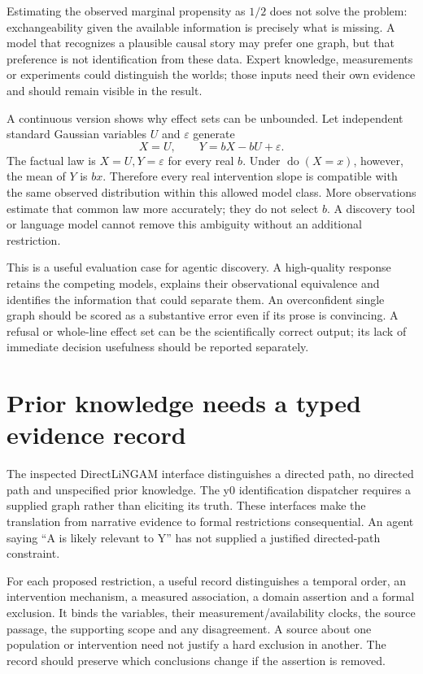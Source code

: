 Estimating the observed marginal propensity as $1/2$ does not solve the
problem: exchangeability given the available information is precisely what is
missing. A model that recognizes a plausible causal story may prefer one graph,
but that preference is not identification from these data. Expert knowledge,
measurements or experiments could distinguish the worlds; those inputs need
their own evidence and should remain visible in the result.

A continuous version shows why effect sets can be unbounded. Let independent
standard Gaussian variables $U$ and $\varepsilon$ generate
\[
 X=U,\qquad Y=bX-bU+\varepsilon.
\]
The factual law is $X=U,Y=\varepsilon$ for every real $b$. Under
$\operatorname{do}(X=x)$, however, the mean of $Y$ is $bx$. Therefore every
real intervention slope is compatible with the same observed distribution
within this allowed model class. More observations estimate that common law
more accurately; they do not select $b$. A discovery tool or language model
cannot remove this ambiguity without an additional restriction.

This is a useful evaluation case for agentic discovery. A high-quality response
retains the competing models, explains their observational equivalence and
identifies the information that could separate them. An overconfident single
graph should be scored as a substantive error even if its prose is convincing.
A refusal or whole-line effect set can be the scientifically correct output;
its lack of immediate decision usefulness should be reported separately.

\section{Prior knowledge needs a typed evidence record}

The inspected DirectLiNGAM interface distinguishes a directed path, no directed
path and unspecified prior knowledge. The y0 identification dispatcher requires
a supplied graph rather than eliciting its truth. These interfaces make the
translation from narrative evidence to formal restrictions consequential.
An agent saying ``A is likely relevant to Y'' has not supplied a justified
directed-path constraint. \citep{v13_sw_lingam,v13_sw_y0}

For each proposed restriction, a useful record distinguishes a temporal order,
an intervention mechanism, a measured association, a domain assertion and a
formal exclusion. It binds the variables, their measurement/availability clocks,
the source passage, the supporting scope and any disagreement. A source about
one population or intervention need not justify a hard exclusion in another.
The record should preserve which conclusions change if the assertion is removed.

